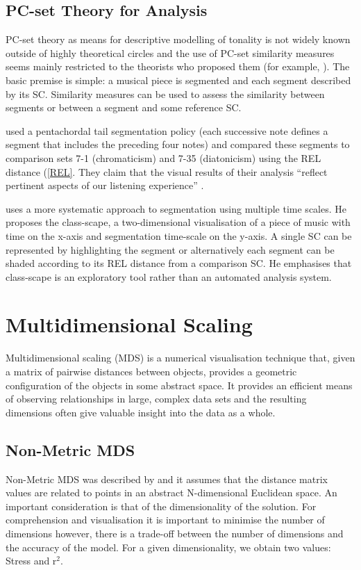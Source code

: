 \documentclass{article}
\begin{document}
\subsection{PC-set Theory for Analysis}
\label{sec-3-6}

PC-set theory as means for descriptive modelling of tonality is not
widely known outside of highly theoretical circles and the use of
PC-set similarity measures seems mainly restricted to the theorists
who proposed them (for example, \citealt{Isaacson1996}). The basic
premise is simple: a musical piece is segmented and each segment
described by its SC. Similarity measures can be used to assess the
similarity between segments or between a segment and some reference
SC.

\citet{Huovinen2007} used a pentachordal tail segmentation policy
(each successive note defines a segment that includes the preceding
four notes) and compared these segments to comparison sets 7-1
(chromaticism) and 7-35 (diatonicism) using the REL distance
(\ref{REL}. They claim that the visual results of their analysis ``reflect
pertinent aspects of our listening experience''
\citep[pp. 204]{Huovinen}.

\citet[chap. 5.3]{Martorell2013} uses a more systematic approach to
segmentation using multiple time scales. He proposes the class-scape,
a two-dimensional visualisation of a piece of music with time on the
x-axis and segmentation time-scale on the y-axis. A single SC can be
represented by highlighting the segment or alternatively each segment
can be shaded according to its REL distance from a comparison SC. He
emphasises that class-scape is an exploratory tool rather than an
automated analysis system.
\section{Multidimensional Scaling}
\label{sec-4}

Multidimensional scaling (MDS) is a numerical visualisation technique
that, given a matrix of pairwise distances between objects, provides a
geometric configuration of the objects in some abstract space. It
provides an efficient means of observing relationships in large,
complex data sets and the resulting dimensions often give valuable
insight into the data as a whole.
\subsection{Non-Metric MDS}
\label{sec-4-1}

Non-Metric MDS was described by \citet{Shepard1962} and it assumes
that the distance matrix values are related to points in an abstract
N-dimensional Euclidean space. An important consideration is that of
the dimensionality of the solution. For comprehension and
visualisation it is important to minimise the number of dimensions
however, there is a trade-off between the number of dimensions and the
accuracy of the model. For a given dimensionality, we obtain two
values: Stress and r$^2$.
\end{document}
